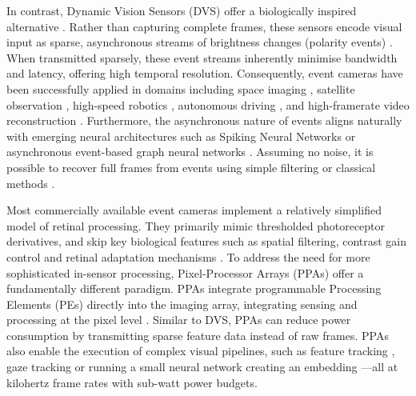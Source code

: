 \documentclass{article}
\begin{document}
In contrast, Dynamic Vision Sensors (DVS) offer a biologically inspired alternative \cite{posch_retinomorphic_2014, gallego_event-based_2022, philip_neuromorphic_2025}. Rather than capturing complete frames, these sensors encode visual input as sparse, asynchronous streams of brightness changes (polarity events) \cite{gallego_event-based_2022,chakravarthi_recent_2024}. When transmitted sparsely, these event streams inherently minimise bandwidth and latency, offering high temporal resolution. Consequently, event cameras have been successfully applied in domains including space imaging \cite{ralph_astrometric_2023}, satellite observation \cite{arja_noise_2024}, high-speed robotics \cite{gallego_event-based_2022, li_robust_2019, bardow_simultaneous_2016}, autonomous driving \cite{maqueda_event-based_2018}, and high-framerate video reconstruction \cite{rebecq_high_2019, scheerlinck_fast_2020}. Furthermore, the asynchronous nature of events aligns naturally with emerging neural architectures such as Spiking Neural Networks \cite{gruel_bio-inspired_2021, arfa_efficient_2025} or asynchronous event-based graph neural networks \cite{schaefer_aegnn_2022, yang_evgnn_2025}. Assuming no noise, it is possible to recover full frames from events using simple filtering or classical methods \cite{scheerlinck_continuous-time_2018, bardow_simultaneous_2016}. 

Most commercially available event cameras \cite{noauthor_metavision_nodate,noauthor_buy_nodate,prophesee_paper} implement a relatively simplified model of retinal processing. They primarily mimic thresholded photoreceptor derivatives, and skip key biological features such as spatial filtering, contrast gain control and retinal adaptation mechanisms \cite{carver_mead_silicon_nodate,wohrer_virtual_2009,field_information_2007}. To address the need for more sophisticated in-sensor processing, Pixel-Processor Arrays (PPAs) offer a fundamentally different paradigm. PPAs integrate programmable Processing Elements (PEs) directly into the imaging array, integrating sensing and processing at the pixel level \cite{dudek_sensor-level_2022, carey_100000_2013}. Similar to DVS, PPAs can reduce power consumption by transmitting sparse feature data instead of raw frames. PPAs also enable the execution of complex visual pipelines, such as feature tracking \cite{bose_descriptor--pixel_nodate}, gaze tracking \cite{bose_pixel_2022} or running a small neural network creating an embedding \cite{so_pixelrnn_2023} —all at kilohertz frame rates with sub-watt power budgets. 
\end{document}
